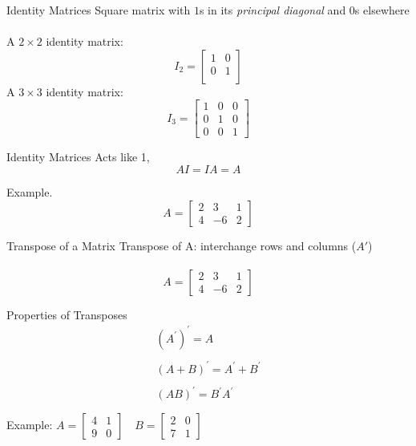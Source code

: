 \documentclass{./../../Latex/teaching_slides}
\begin{document}
\begin{frame}{Identity Matrices}
Square matrix with $1$s in its \textit{principal diagonal} and $0$s elsewhere \\~\\
A $2 \times 2$ identity matrix:
$$ I_2 = \begin{bmatrix}
1 & 0\\
0 & 1 \\
\end{bmatrix}$$
A $3 \times 3$ identity matrix:
$$ I_3 = \begin{bmatrix}
1 & 0 & 0 \\
0 & 1 & 0\\
0 & 0 & 1
\end{bmatrix}$$

\end{frame}

\begin{frame}{Identity Matrices}
Acts like 1, 
$$ AI = IA = A $$

\vspace{2em}

Example. 
$$A = \begin{bmatrix}
2 & 3 & 1 \\
4 & -6 & 2
\end{bmatrix}$$
\end{frame}


\begin{frame}{Transpose of a Matrix}
Transpose of A: interchange rows and columns ($A'$) \\~\\
$$A = \begin{bmatrix}
2 & 3 & 1 \\
4 & -6 & 2
\end{bmatrix}$$
\end{frame}

\begin{frame}{Properties of Transposes}
$$
\begin{array}{l}
\left(A^{\prime}\right)^{\prime}=A \\~\\
(A+B)^{\prime}=A^{\prime}+B^{\prime} \\~\\
(A B)^{\prime}=B^{\prime} A^{\prime} \\~\\
\end{array}
$$
Example:
\( A=\left[\begin{array}{ll}4 & 1 \\ 9 & 0\end{array}\right] \quad B=\left[\begin{array}{ll}2 & 0 \\ 7 & 1\end{array}\right] \)
\end{frame}
\end{document}
